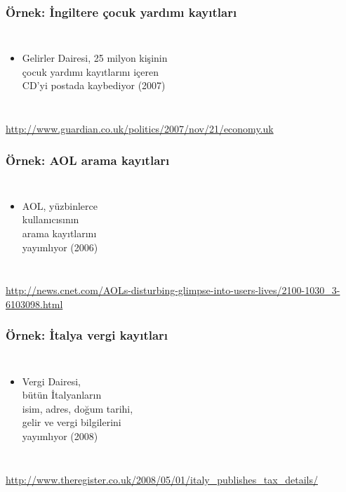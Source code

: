 \documentclass[dvipsnames]{beamer}
\theoremstyle{definition}
\theoremstyle{example}
\theoremstyle{plain}
\begin{document}
\begin{frame}
  \frametitle{Örnek: İngiltere çocuk yardımı kayıtları}

  \begin{columns}

    \begin{itemize}
      \item Gelirler Dairesi, 25 milyon kişinin\\
        çocuk yardımı kayıtlarını içeren\\
        CD'yi postada kaybediyor (2007)
    \end{itemize}
  \end{columns}

  \medskip
  \tiny{\url{http://www.guardian.co.uk/politics/2007/nov/21/economy.uk}}\\
\end{frame}

\begin{frame}
  \frametitle{Örnek: AOL arama kayıtları}

  \begin{columns}

    \begin{itemize}
      \item AOL, yüzbinlerce\\
        kullanıcısının\\
        arama kayıtlarını\\
        yayımlıyor (2006)
    \end{itemize}
  \end{columns}

  \medskip
  \tiny{\url{http://news.cnet.com/AOLs-disturbing-glimpse-into-users-lives/2100-1030_3-6103098.html}}\\
\end{frame}

\begin{frame}
  \frametitle{Örnek: İtalya vergi kayıtları}

  \begin{columns}

    \begin{itemize}
      \item Vergi Dairesi,\\
        bütün İtalyanların\\
        isim, adres, doğum tarihi,\\
        gelir ve vergi bilgilerini\\
        yayımlıyor (2008)
    \end{itemize}
  \end{columns}

  \medskip
  \tiny{\url{http://www.theregister.co.uk/2008/05/01/italy_publishes_tax_details/}}\\
\end{frame}
\end{document}
